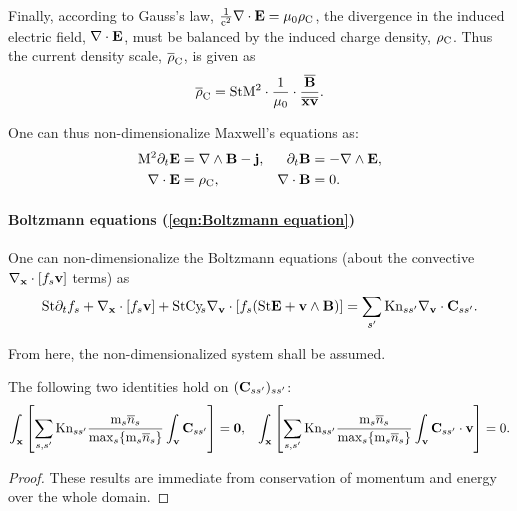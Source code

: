     Finally, according to Gauss's law, $\frac{1}{\mathrm{c}^{2}}\nabla\cdot\mathbf{E}  =  \mu_{0}\rho_{\mathrm{C}}$, the divergence in the induced electric field, $\nabla\cdot\mathbf{E}$, must be balanced by the induced charge density, $\rho_{\mathrm{C}}$. Thus the current density scale, $\overline{\rho}_{\mathrm{C}}$, is given as
    \begin{equation}
        \overline{\rho}_{\mathrm{C}}  =  \mathrm{St}\mathrm{M}^{2}\cdot\frac{1}{\mu_{0}}\cdot\frac{\overline{\mathbf{B}}}{\overline{\mathbf{x}}\overline{\mathbf{v}}}.
    \end{equation}
    
    One can thus non-dimensionalize Maxwell's equations as:
    \begin{align}
        \mathrm{M}^{2}\partial_{t}\mathbf{E}  &=  \nabla\wedge\mathbf{B} - \mathbf{j},  &
        \partial_{t}\mathbf{B}  &=  - \nabla\wedge\mathbf{E},  \label{eqn:Maxwell's equations transient non-dimensionalized}  \\
        \nabla\cdot\mathbf{E}  &=  \rho_{\mathrm{C}},  &
        \nabla\cdot\mathbf{B}  &=  0.  \label{eqn:Maxwell's equations steady-state non-dimensionalized}
    \end{align}

    \paragraph*{Boltzmann equations (\ref{eqn:Boltzmann equation})} One can non-dimensionalize the Boltzmann equations (about the convective $\nabla_{\mathbf{x}}\cdot[f_{s}\mathbf{v}]$ terms) as
    \begin{equation}\label{eqn:Boltzmann equation non-dimensionalized}
        \mathrm{St}\partial_{t}f_{s} + \nabla_{\mathbf{x}}\cdot[f_{s}\mathbf{v}] + \mathrm{St}\mathrm{Cy}\!_{s}\nabla_{\mathbf{v}}\cdot[f_{s}(\mathrm{St}\mathbf{E} + \mathbf{v}\wedge\mathbf{B})]  =   \sum_{s'}\mathrm{Kn}_{ss'}\nabla_{\mathbf{v}}\cdot\mathbf{C}_{ss'}.
    \end{equation}
    
    \shortline

    From here, the non-dimensionalized system shall be assumed.
    
    \begin{lemma}\label{lem:conservation on collision operators}
        The following two identities hold on $(\mathbf{C}_{ss'})_{ss'}$:
        \begin{align}
            \int_{\mathbf{x}}\left[\sum_{s, s'}\mathrm{Kn}_{ss'}\frac{\mathrm{m}_{s}\overline{n}_{s}}{\max_{s}\{\mathrm{m}_{s}\overline{n}_{s}\}}\int_{\mathbf{v}}\mathbf{C}_{ss'}\right]  =  \mathbf{0},  &&
            \int_{\mathbf{x}}\left[\sum_{s, s'}\mathrm{Kn}_{ss'}\frac{\mathrm{m}_{s}\overline{n}_{s}}{\max_{s}\{\mathrm{m}_{s}\overline{n}_{s}\}}\int_{\mathbf{v}}\mathbf{C}_{ss'}\cdot\mathbf{v}\right]  =  0.
        \end{align}
    \end{lemma}
    \begin{proof}
        These results are immediate from conservation of momentum and energy over the whole domain.
    \end{proof}
    